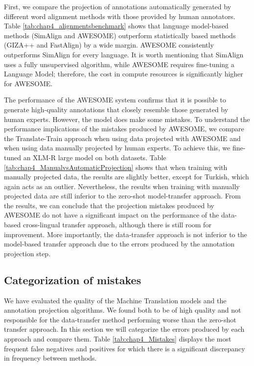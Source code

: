 




First, we compare the projection of annotations automatically generated by different word alignment methods with those provided by human annotators. Table \ref{tab:chap4_alignmentsbenchmark} shows that language model-based methods (SimAlign and AWESOME) outperform statistically based methods (GIZA++ and FastAlign) by a wide margin. AWESOME consistently outperforms SimAlign for every language. It is worth mentioning that SimAlign uses a fully unsupervised algorithm, while AWESOME requires fine-tuning a Language Model; therefore, the cost in compute resources is significantly higher for AWESOME.



The performance of the AWESOME system confirms that it is possible to generate high-quality annotations that closely resemble those generated by human experts. However, the model does make some mistakes. To understand the performance implications of the mistakes produced by AWESOME, we compare the Translate-Train approach when using data projected with AWESOME and when using data manually projected by human experts. To achieve this, we fine-tuned an XLM-R large model on both datasets. Table \ref{tab:chap4_ManualvsAutomaticProjection} shows that when training with manually projected data, the results are slightly better, except for Turkish, which again acts as an outlier. Nevertheless, the results when training with manually projected data are still inferior to the zero-shot model-transfer approach. From the results, we can conclude that the projection mistakes produced by AWESOME do not have a significant impact on the performance of the data-based cross-lingual transfer approach, although there is still room for improvement. More importantly, the data-transfer approach is not inferior to the model-based transfer approach due to the errors produced by the annotation projection step.




\subsection{Categorization of mistakes}
We have evaluated the quality of the Machine Translation models and the annotation projection algorithms. We found both to be of high quality and not responsible for the data-transfer method performing worse than the zero-shot transfer approach. In this section we will categorize the errors produced by each approach and compare them. Table \ref{tab:chap4_Mistakes} displays the most frequent false negatives and positives for which there is a significant discrepancy in frequency between methods.


